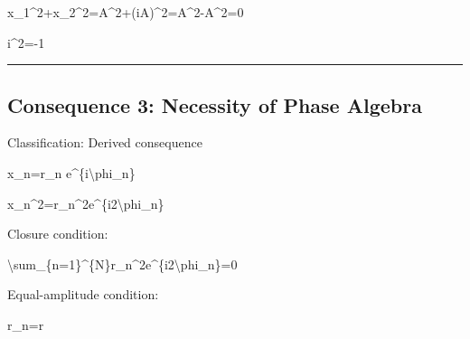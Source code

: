 \documentclass[
  a4paper]{article}
\newenvironment{Shaded}{}{}
\newcommand{\NormalTok}[1]{#1}
\begin{document}
\begin{Shaded}
\begin{Highlighting}[]
\NormalTok{x\_1\^{}2+x\_2\^{}2=A\^{}2+(iA)\^{}2=A\^{}2{-}A\^{}2=0}
\end{Highlighting}
\end{Shaded}

\begin{Shaded}
\begin{Highlighting}[]
\NormalTok{i\^{}2={-}1}
\end{Highlighting}
\end{Shaded}

\begin{center}\rule{0.5\linewidth}{0.5pt}\end{center}

\subsection{Consequence 3: Necessity of Phase
Algebra}\label{consequence-3-necessity-of-phase-algebra}

Classification: Derived consequence

\begin{Shaded}
\begin{Highlighting}[]
\NormalTok{x\_n=r\_n e\^{}\{i\textbackslash{}phi\_n\}}
\end{Highlighting}
\end{Shaded}

\begin{Shaded}
\begin{Highlighting}[]
\NormalTok{x\_n\^{}2=r\_n\^{}2e\^{}\{i2\textbackslash{}phi\_n\}}
\end{Highlighting}
\end{Shaded}

Closure condition:

\begin{Shaded}
\begin{Highlighting}[]
\NormalTok{\textbackslash{}sum\_\{n=1\}\^{}\{N\}r\_n\^{}2e\^{}\{i2\textbackslash{}phi\_n\}=0}
\end{Highlighting}
\end{Shaded}

Equal-amplitude condition:

\begin{Shaded}
\begin{Highlighting}[]
\NormalTok{r\_n=r}
\end{Highlighting}
\end{Shaded}
\end{document}
